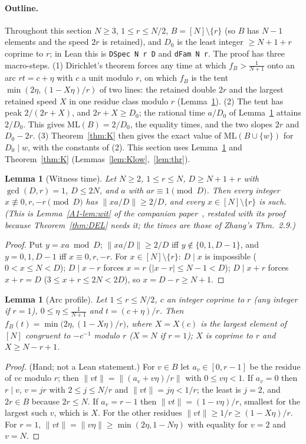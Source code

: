 \documentclass[11pt]{article}
\newtheorem{lemma}[theorem]{Lemma}
\theoremstyle{definition}
\theoremstyle{remark}
\newcommand{\nd}[1]{\lVert #1\rVert}
\newcommand{\ML}{\mathrm{ML}}
\newcommand{\xA}[1]{\ref{A1-#1}}
\begin{document}
\paragraph{Outline.}
Throughout this section $N\ge3$, $1\le r\le N/2$, $B=[N]\setminus\{r\}$ (so $B$ has $N-1$ elements and the speed $2r$ is retained), and $D_0$ is the least integer $\ge N+1+r$ coprime to $r$; in Lean this is \texttt{DSpec N r D} and \texttt{dFam N r}. The proof has three macro-steps. (1) Dirichlet's theorem forces any time at which $f_B>\frac1{N+1}$ onto an arc $rt=c+\eta$ with $c$ a unit modulo $r$, on which $f_B$ is the tent $\min(2\eta,(1-X\eta)/r)$ of two lines: the retained double $2r$ and the largest retained speed $X$ in one residue class modulo $r$ (Lemma~\ref{lem:arc}). (2) The tent has peak $2/(2r+X)$, and $2r+X\ge D_0$; the rational time $a/D_0$ of Lemma~\ref{lem:wit} attains $2/D_0$. This gives $\ML(B)=2/D_0$, the equality times, and the two slopes $2r$ and $D_0-2r$. (3) Theorem~\ref{thm:K} then gives the exact value of $\ML(B\cup\{w\})$ for $D_0\mid w$, with the constants of (2). This section uses Lemma~\ref{lem:wit} and Theorem~\ref{thm:K} (Lemmas~\ref{lem:Klow},~\ref{lem:thr}).

\begin{lemma}[Witness time]\label{lem:wit}
Let $N\ge2$, $1\le r\le N$, $D\ge N+1+r$ with $\gcd(D,r)=1$, $D\le2N$, and $a$ with $ar\equiv1\pmod D$. Then every integer $x\not\equiv0,r,-r\pmod D$ has $\nd{xa/D}\ge2/D$, and every $x\in[N]\setminus\{r\}$ is such. (This is Lemma~\xA{lem:wit} of the companion paper~\cite{A1}, restated with its proof because Theorem~\ref{thm:DEL} needs it; the times are those of Zhang's Thm.~2.9.)
\end{lemma}
\begin{proof}
Put $y=xa\bmod D$; $\nd{xa/D}\ge2/D$ iff $y\notin\{0,1,D-1\}$, and $y=0,1,D-1$ iff $x\equiv0,r,-r$. For $x\in[N]\setminus\{r\}$: $D\mid x$ is impossible ($0<x\le N<D$); $D\mid x-r$ forces $x=r$ ($|x-r|\le N-1<D$); $D\mid x+r$ forces $x+r=D$ ($3\le x+r\le2N<2D$), so $x=D-r\ge N+1$.
\end{proof}


\begin{lemma}[Arc profile]\label{lem:arc}
Let $1\le r\le N/2$, $c$ an integer coprime to $r$ (any integer if $r=1$), $0\le\eta\le\frac1{N+1}$ and $t=(c+\eta)/r$. Then $f_B(t)=\min\bigl(2\eta,(1-X\eta)/r\bigr)$, where $X=X(c)$ is the largest element of $[N]$ congruent to $-c^{-1}$ modulo $r$ ($X=N$ if $r=1$); $X$ is coprime to $r$ and $X\ge N-r+1$.
\end{lemma}
\begin{proof}
(Hand; not a Lean statement.) For $v\in B$ let $a_v\in[0,r-1]$ be the residue of $vc$ modulo $r$; then $\nd{vt}=\nd{(a_v+v\eta)/r}$ with $0\le v\eta<1$. If $a_v=0$ then $r\mid v$, $v=jr$ with $2\le j\le N/r$ and $\nd{vt}=j\eta<1/r$; the least is $j=2$, and $2r\in B$ because $2r\le N$. If $a_v=r-1$ then $\nd{vt}=(1-v\eta)/r$, smallest for the largest such $v$, which is $X$. For the other residues $\nd{vt}\ge1/r\ge(1-X\eta)/r$. For $r=1$, $\nd{vt}=\nd{v\eta}\ge\min(2\eta,1-N\eta)$ with equality for $v=2$ and $v=N$.
\end{proof}
\end{document}
